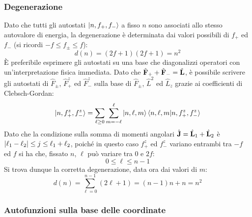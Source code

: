 \subsubsection{Degenerazione}

Dato che tutti gli autostati $ \ket{n,f_+,f_-} $ a fisso $ n $ sono associati allo stesso autovalore di energia, la degenerazione è determinata dai valori possibili di $ f_+ $ ed $ f_- $ (si ricordi $ -f \le f_{\pm} \le f $):
\begin{equation}
	d(n) = (2f + 1) (2f + 1) = n^2
	\label{eq:3.63}
\end{equation}
È preferibile esprimere gli autostati su una base che diagonalizzi operatori con un'interpretazione fisica immediata. Dato che $ \hat{\mathbf{F}}_+ + \hat{\mathbf{F}}_- = \hat{\mathbf{L}} $, è possibile scrivere gli autostati di $ \hat{F}_{\pm} $, $ \hat{F}_+^z $ ed $ \hat{F}_-^z $ sulla base di $ \hat{F}_{\pm} $, $ \hat{L}^2 $ ed $ \hat{L}_z $ grazie ai coefficienti di Clebsch-Gordan:
\begin{equation}
	\ket{n,f_+^z,f_-^z} = \sum_{\ell \ge 0} \sum_{m = -\ell}^{\ell} \ket{n,\ell,m} \braket{n,\ell,m | n,f_+^z,f_-^z}
	\label{eq:3.64}
\end{equation}
Dato che la condizione sulla somma di momenti angolari $ \hat{\mathbf{J}} = \hat{\mathbf{L}}_1 + \hat{\mathbf{L}}_2 $ è $ \left\lvert\ell_1 - \ell_2\right\rvert \le j \le \ell_1 + \ell_2 $, poiché in questo caso $ f_+^z $ ed $ f_-^z $ variano entrambi tra $ -f $ ed $ f $ si ha che, fissato $ n $, $ \ell $ può variare tra $ 0 $ e $ 2f $:
\begin{equation}
	0 \le \ell \le n - 1
	\label{eq:3.65}
\end{equation}
Si trova dunque la corretta degenerazione, data ora dai valori di $ m $:
\begin{equation*}
	d(n) = \sum_{\ell = 0}^{n - 1} (2\ell + 1) = (n - 1) n + n = n^2
\end{equation*}

\subsubsection{Autofunzioni sulla base delle coordinate}

